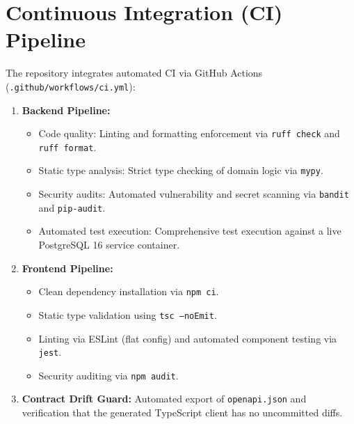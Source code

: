 \section{Continuous Integration (CI) Pipeline}
The repository integrates automated CI via GitHub Actions (\texttt{.github/workflows/ci.yml}):
\begin{enumerate}
    \item \textbf{Backend Pipeline:}
    \begin{itemize}
        \item Code quality: Linting and formatting enforcement via \texttt{ruff check} and \texttt{ruff format}.
        \item Static type analysis: Strict type checking of domain logic via \texttt{mypy}.
        \item Security audits: Automated vulnerability and secret scanning via \texttt{bandit} and \texttt{pip-audit}.
        \item Automated test execution: Comprehensive test execution against a live PostgreSQL 16 service container.
    \end{itemize}
    \item \textbf{Frontend Pipeline:}
    \begin{itemize}
        \item Clean dependency installation via \texttt{npm ci}.
        \item Static type validation using \texttt{tsc --noEmit}.
        \item Linting via ESLint (flat config) and automated component testing via \texttt{jest}.
        \item Security auditing via \texttt{npm audit}.
    \end{itemize}
    \item \textbf{Contract Drift Guard:} Automated export of \texttt{openapi.json} and verification that the generated TypeScript client has no uncommitted diffs.
\end{enumerate}

